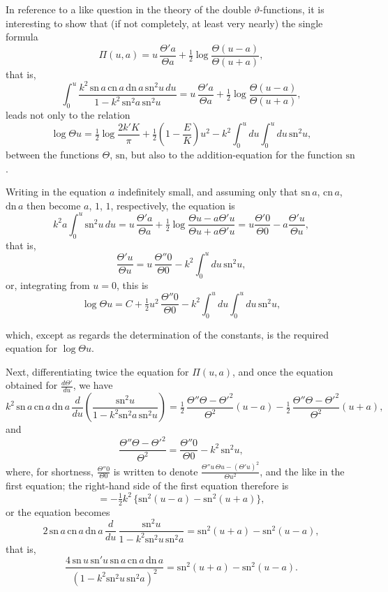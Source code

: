 \documentclass[11pt,a4paper]{article}
\begin{document}
\bigskip

\noindent
In reference to a like question in the theory of the double
$\vartheta$-functions, it is interesting to show that (if not completely, at
least very nearly) the single formula
\[
  \Pi(u, a) = u\,\frac{\Theta' a}{\Theta a}
   + \tfrac{1}{2}\log\frac{\Theta(u - a)}{\Theta(u + a)},
\]
that is,
\[
  \int_{0}^{u} \frac{k^{2}\,\mathrm{sn}\,a\,\mathrm{cn}\,a\,\mathrm{dn}\,a\,\mathrm{sn}^{2} u\,du}
       {1 - k^{2}\,\mathrm{sn}^{2} a\,\mathrm{sn}^{2} u}
   = u\,\frac{\Theta' a}{\Theta a}
   + \tfrac{1}{2}\log\frac{\Theta(u - a)}{\Theta(u + a)},
\]
leads not only to the relation
\[
  \log\Theta u = \tfrac{1}{2}\log\frac{2k'K}{\pi}
   + \tfrac{1}{2}\left(1 - \frac{E}{K}\right)u^{2}
   - k^{2} \int_{0}^{u} du \int_{0}^{u} du\,\mathrm{sn}^{2} u,
\]
between the functions $\Theta$, $\mathrm{sn}$, but also to the
addition-equation for the function $\mathrm{sn}$.

Writing in the equation $a$ indefinitely small, and assuming only that
$\mathrm{sn}\,a$, $\mathrm{cn}\,a$, $\mathrm{dn}\,a$ then become $a$, $1$,
$1$, respectively, the equation is
\[
  k^{2} a \int_{0}^{u} \mathrm{sn}^{2} u\,du
   = u\,\frac{\Theta' a}{\Theta a} + \tfrac{1}{2}\log\frac{\Theta u - a\Theta'u}
                                                          {\Theta u + a\Theta'u}
   = u\frac{\Theta'0}{\Theta 0} - a\frac{\Theta'u}{\Theta u},
\]
that is,
\[
  \frac{\Theta'u}{\Theta u} = u\,\frac{\Theta''0}{\Theta 0}
   - k^{2}\int_{0}^{u} du\,\mathrm{sn}^{2} u,
\]
or, integrating from $u = 0$, this is
\[
  \log\Theta u = C + \tfrac{1}{2} u^{2}\,\frac{\Theta''0}{\Theta 0}
   - k^{2}\int_{0}^{u} du \int_{0}^{u} du\,\mathrm{sn}^{2} u,
\]

which, except as regards the determination of the constants, is the required
equation for $\log\Theta u$.

Next, differentiating twice the equation for $\Pi(u, a)$, and once the
equation obtained for $\frac{d\Theta'}{du}$, we have
\[
  k^{2}\,\mathrm{sn}\,a\,\mathrm{cn}\,a\,\mathrm{dn}\,a\,
   \frac{d}{du}\left(\frac{\mathrm{sn}^{2} u}{1 - k^{2}\mathrm{sn}^{2} a\,\mathrm{sn}^{2} u}\right)
   = \tfrac{1}{2}\,\frac{\Theta''\Theta - \Theta'^{2}}{\Theta^{2}}(u - a)
    - \tfrac{1}{2}\,\frac{\Theta''\Theta - \Theta'^{2}}{\Theta^{2}}(u + a),
\]
and
\[
  \frac{\Theta''\Theta - \Theta'^{2}}{\Theta^{2}}
   = \frac{\Theta''0}{\Theta 0} - k^{2}\,\mathrm{sn}^{2} u,
\]
where, for shortness, $\frac{\Theta''0}{\Theta 0}$ is written to denote
$\frac{\Theta'' u\,\Theta u - (\Theta'u)^{2}}{\Theta u^{2}}$, and the like in
the first equation; the right-hand side of the first equation therefore is
\[
  = -\tfrac{1}{2} k^{2}\,\{\mathrm{sn}^{2}(u - a) - \mathrm{sn}^{2}(u + a)\},
\]
or the equation becomes
\[
  2\,\mathrm{sn}\,a\,\mathrm{cn}\,a\,\mathrm{dn}\,a\,
   \frac{d}{du}\,\frac{\mathrm{sn}^{2} u}{1 - k^{2}\mathrm{sn}^{2} u\,\mathrm{sn}^{2} a}
   = \mathrm{sn}^{2}(u + a) - \mathrm{sn}^{2}(u - a),
\]
that is,
\[
  \frac{4\,\mathrm{sn}\,u\,\mathrm{sn}'u\,\mathrm{sn}\,a\,\mathrm{cn}\,a\,\mathrm{dn}\,a}
       {(1 - k^{2}\mathrm{sn}^{2} u\,\mathrm{sn}^{2} a)^{2}}
   = \mathrm{sn}^{2}(u + a) - \mathrm{sn}^{2}(u - a).
\]
\end{document}
